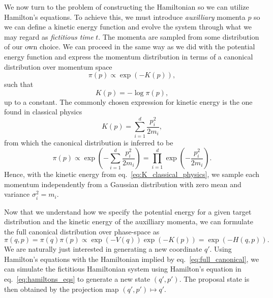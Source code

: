 We now turn to the problem of constructing the Hamiltonian so we can utilize Hamilton's equations.
To achieve this, we must introduce \textit{auxilliary} momenta $p$ so we can define a kinetic energy function
and evolve the system through what we may regard as \textit{fictitious time} $t$. 
The momenta are sampled from some distribution of our own choice. We can proceed in the same way as we did
with the potential energy function and express the momentum distribution in terms of a canonical distribution
over momentum space
\begin{equation}
  \pi(p) \propto \exp\left(-K(p)\right),
\end{equation}
such that
\begin{equation}
  K(p) = -\log \pi (p),
\end{equation}
up to a constant. The commonly chosen expression for kinetic energy is 
the one found in classical physics
\begin{equation}\label{eq:K_classical_physics}
  K(p) = \sum_{i=1}^d \frac{p_i^2}{2m_i},
\end{equation}
from which the canonical distribution is inferred to be
\begin{equation}\label{eq:canonical_p}
  \pi(p) \propto \exp\left(-\sum_{i=1}^d \frac{p_i^2}{2m_i}\right) = \prod_{i=1}^d \exp\left(-\frac{p_i^2}{2m_i}\right).
\end{equation}
Hence, with the kinetic energy from eq.~\eqref{eq:K_classical_physics}, we 
sample each momentum independently from a Gaussian distribution with zero mean and variance $\sigma_i^2 = m_i$.

Now that we understand how we specify the potential energy for a given target distribution and
the kinetic energy of the auxilliary momenta, we can formulate the full canonical distribution over phase-space as
\begin{equation}\label{eq:full_canonical}
  \pi(q, p) = \pi(q)\pi(p) \propto \exp\left(-V(q)\right)\exp\left(-K(p)\right) = \exp\left(-H(q, p)\right).
\end{equation}
We are naturally just interested in generating a new coordinate $q'$. Using Hamilton's equations
with the Hamiltonian implied by eq.~\eqref{eq:full_canonical}, we can simulate the fictitious Hamiltonian
system using Hamilton's equation in eq.~\eqref{eq:hamiltons_eqs} to generate a new state $(q', p')$. The proposal state
is then obtained by the projection map $(q', p') \mapsto q'$. 

